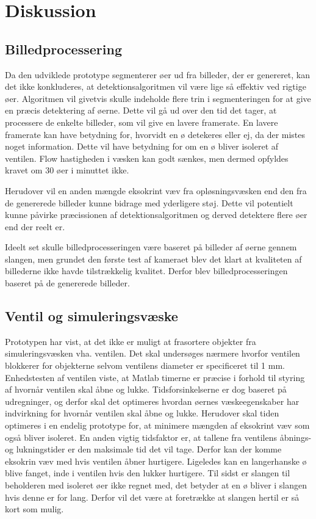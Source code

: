 \chapter{Diskussion}

\section{Billedprocessering}
Da den udviklede prototype segmenterer øer ud fra billeder, der er genereret, kan det ikke konkluderes, at detektionsalgoritmen vil være lige så effektiv ved rigtige øer. Algoritmen vil givetvis skulle indeholde flere trin i segmenteringen for at give en præcis detektering af øerne. Dette vil gå ud over den tid det tager, at processere de enkelte billeder, som vil give en lavere framerate. En lavere framerate kan have betydning for, hvorvidt en ø detekeres eller ej, da der mistes noget information. Dette vil have betydning for om en ø bliver isoleret af ventilen. Flow hastigheden i væsken kan godt sænkes, men dermed opfyldes kravet om 30 øer i minuttet ikke.

Herudover vil en anden mængde eksokrint væv fra opløsningsvæsken end den fra de genererede billeder kunne bidrage med yderligere støj. Dette vil potentielt kunne påvirke præcissionen af detektionsalgoritmen og derved detektere flere øer end der reelt er. 

Ideelt set skulle billedprocesseringen være baseret på billeder af øerne gennem slangen, men grundet den første test af kameraet blev det klart at kvaliteten af billederne ikke havde tilstrækkelig kvalitet. Derfor blev billedprocesseringen baseret på de genererede billeder. 

\section{Ventil og simuleringsvæske}
Prototypen har vist, at det ikke er muligt at frasortere objekter fra simuleringsvæsken vha. ventilen. Det skal undersøges nærmere hvorfor ventilen blokkerer for objekterne selvom ventilens diameter er specificeret til 1 mm. Enhedstesten af ventilen viste, at Matlab timerne er præcise i forhold til styring af hvornår ventilen skal åbne og lukke. Tidsforsinkelserne er dog baseret på udregninger, og derfor skal det optimeres hvordan øernes væskeegenskaber har indvirkning for hvornår ventilen skal åbne og lukke. Herudover skal tiden optimeres i en endelig prototype for, at minimere mængden af eksokrint væv som også bliver isoleret. En anden vigtig tidsfaktor er, at tallene fra ventilens åbnings- og lukningstider er den maksimale tid det vil tage. Derfor kan der komme eksokrin væv med hvis ventilen åbner hurtigere. Ligeledes kan en langerhanske ø blive fanget, inde i ventilen hvis den lukker hurtigere. Til sidst er slangen til beholderen med isoleret øer ikke regnet med, det betyder at en ø bliver i slangen hvis denne er for lang. Derfor vil det være at foretrække at slangen hertil er så kort som mulig.




